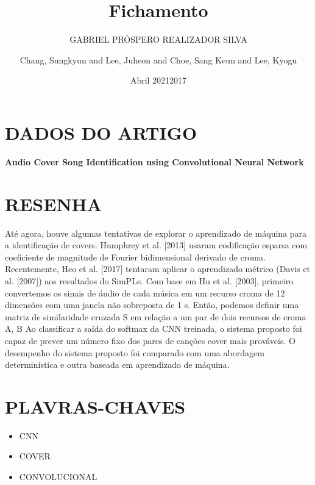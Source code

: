 \documentclass{article}
\title{Fichamento}
\author{GABRIEL PRÓSPERO REALIZADOR  SILVA}
\date{Abril 2021}
\begin{document}
\maketitle

\section{DADOS DO ARTIGO}
\textbf{ Audio Cover Song Identification using Convolutional Neural Network  \\}
\author{Chang, Sungkyun and Lee, Juheon and Choe, Sang Keun and Lee, Kyogu \\}
\date{2017}

\section{RESENHA}
Até agora, houve algumas tentativas de explorar o aprendizado de máquina para a identificação de covers. Humphrey et al. [2013] usaram codificação esparsa com coeficiente de magnitude de Fourier bidimensional derivado de croma. Recentemente, Heo et al. [2017] tentaram aplicar o aprendizado métrico (Davis et al. [2007]) aos resultados do SimPLe.
Com base em Hu et al. [2003], primeiro convertemos os sinais de áudio de cada música em um recurso croma de 12 dimensões com uma janela não sobreposta de 1 s. Então, podemos definir uma matriz de similaridade cruzada S em relação a um par de dois recursos de croma {A, B}
Ao classificar a saída do softmax da CNN treinada, o sistema proposto foi capaz de prever um número fixo dos pares de canções cover mais prováveis. O desempenho do sistema proposto foi comparado com uma abordagem determinística e outra baseada em aprendizado de máquina.

\section{PLAVRAS-CHAVES}
\begin{itemize}
    \item CNN
    \item COVER
    \item CONVOLUCIONAL
\end{itemize}
\end{document}
